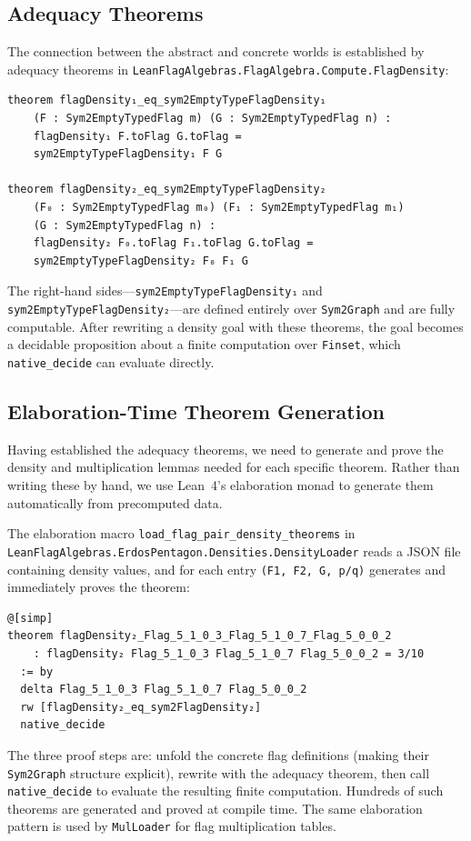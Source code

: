 \documentclass{article}
\newcommand{\lean}[1]{\texttt{#1}}
\begin{document}
\subsection{Adequacy Theorems}

The connection between the abstract and concrete worlds is established by
adequacy theorems in \lean{LeanFlagAlgebras.FlagAlgebra.Compute.FlagDensity}:

\begin{lstlisting}
theorem flagDensity₁_eq_sym2EmptyTypeFlagDensity₁
    (F : Sym2EmptyTypedFlag m) (G : Sym2EmptyTypedFlag n) :
    flagDensity₁ F.toFlag G.toFlag =
    sym2EmptyTypeFlagDensity₁ F G

theorem flagDensity₂_eq_sym2EmptyTypeFlagDensity₂
    (F₀ : Sym2EmptyTypedFlag m₀) (F₁ : Sym2EmptyTypedFlag m₁)
    (G : Sym2EmptyTypedFlag n) :
    flagDensity₂ F₀.toFlag F₁.toFlag G.toFlag =
    sym2EmptyTypeFlagDensity₂ F₀ F₁ G
\end{lstlisting}
The right-hand sides---\lean{sym2EmptyTypeFlagDensity₁} and
\lean{sym2EmptyTypeFlagDensity₂}---are defined entirely over \lean{Sym2Graph}
and are fully computable.  After rewriting a density goal with these theorems,
the goal becomes a decidable proposition about a finite computation over
\lean{Finset}, which \lean{native\_decide} can evaluate directly.

\subsection{Elaboration-Time Theorem Generation}

Having established the adequacy theorems, we need to generate and prove the
density and multiplication lemmas needed for each specific theorem.  Rather
than writing these by hand, we use Lean~4's elaboration monad to generate them
automatically from precomputed data.

The elaboration macro \lean{load\_flag\_pair\_density\_theorems} in
\lean{LeanFlagAlgebras.ErdosPentagon.Densities.DensityLoader} reads a JSON
file containing density values, and for each entry \lean{(F1, F2, G, p/q)}
generates and immediately proves the theorem:
\begin{lstlisting}
@[simp]
theorem flagDensity₂_Flag_5_1_0_3_Flag_5_1_0_7_Flag_5_0_0_2
    : flagDensity₂ Flag_5_1_0_3 Flag_5_1_0_7 Flag_5_0_0_2 = 3/10
  := by
  delta Flag_5_1_0_3 Flag_5_1_0_7 Flag_5_0_0_2
  rw [flagDensity₂_eq_sym2FlagDensity₂]
  native_decide
\end{lstlisting}
The three proof steps are: unfold the concrete flag definitions (making their
\lean{Sym2Graph} structure explicit), rewrite with the adequacy theorem, then
call \lean{native\_decide} to evaluate the resulting finite computation.
Hundreds of such theorems are generated and proved at compile time.  The same
elaboration pattern is used by \lean{MulLoader} for flag multiplication tables.
\end{document}
